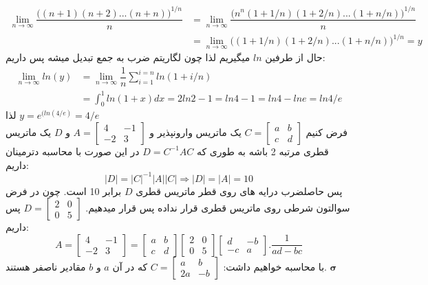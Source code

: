 \begin{align*}
\lim_{n\rightarrow \infty } \dfrac{{\Big( (n+1) (n+2)... (n+n)\Big)}^{1/n}}{n}&=\lim_{n\rightarrow \infty } \dfrac{{\Big(n^n (1+1/n) (1+2/n)... (1+n/n)\Big)}^{1/n} }{n} \\
&=\lim_{n\rightarrow \infty} {\Big((1+1/n) (1+2/n)... (1+n/n)\Big)}^{1/n}=y
\end{align*}
حال از طرفین $ln$ میگیریم لذا چون لگاریتم ضرب به جمع تبدیل میشه پس داریم:
\begin{align*}
\lim_{n\rightarrow \infty} ln (y)&=\lim_{n\rightarrow \infty}\dfrac{1}{n} \sum_{i=1}^{i=n} ln(1+i/n) \\
&= \int_{0}^{1} ln(1+x) dx=2ln2-1=ln4-1=ln 4-ln e=ln 4/e
\end{align*}
لذا
$y= e^{(ln(4/e)}=4/e$\\
فرض کنیم
$C=\begin{bmatrix}
a & b \\
c & d
\end{bmatrix} $
یک ماتریس وارونپذیر و
$A=\begin{bmatrix}
4 & -1 \\
-2 & 3
\end{bmatrix} $
و $D$ یک ماتریس قطری مرتبه 2 باشه به طوری که
$D=C^{-1}AC$
در این صورت با محاسبه دترمینان داریم:
$$ \vert D \vert = {\vert C \vert}^{-1} \vert A \vert \vert C\vert \Longrightarrow \vert D \vert = {\vert A \vert}=10$$
پس حاصلضرب درایه های روی قطر ماتریس قطری $D$ برابر 10 است. چون در فرض سوالتون شرطی روی ماتریس قطری قرار نداده پس قرار میدهیم.
$D=\begin{bmatrix}
2 & 0 \\
0 & 5
\end{bmatrix}
$
پس داریم:
$$
A=\begin{bmatrix}
4 & -1 \\
-2 & 3
\end{bmatrix}=\begin{bmatrix}
a & b \\
c & d
\end{bmatrix} \begin{bmatrix}
2 & 0 \\
0 & 5
\end{bmatrix} \begin{bmatrix}
d & -b \\
-c & a
\end{bmatrix}.\dfrac{1}{ad-bc}
$$
با محاسبه خواهیم داشت:
$C= \begin{bmatrix}
a & b \\
2a & -b
\end{bmatrix}$
که در آن $a$ و $b$ مقادیر ناصفر هستند.
${ \pmb\sigma} $

